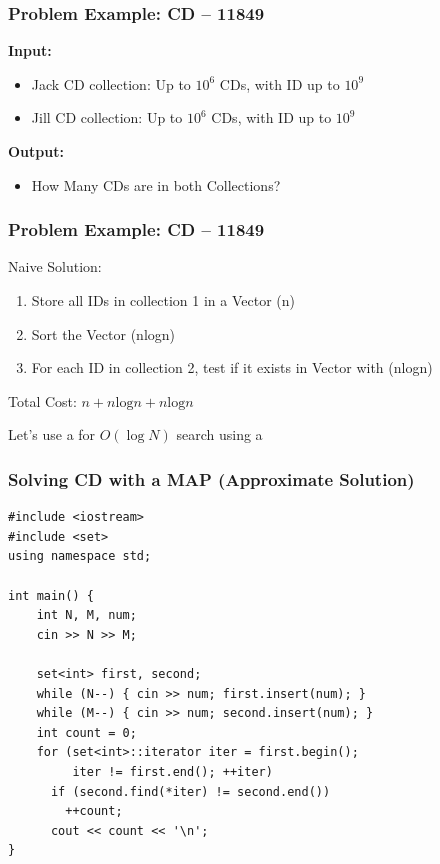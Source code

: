 \documentclass{beamer}
\begin{document}
\begin{frame}
  \frametitle{Problem Example: CD -- 11849}

  \begin{block}{}
    {\bf Input:}
    \begin{itemize}
    \item Jack CD collection: Up to $10^6$ CDs, with ID up to $10^9$
    \item Jill CD collection: Up to $10^6$ CDs, with ID up to $10^9$
    \end{itemize}

    {\bf Output:}
    \begin{itemize}
    \item How Many CDs are in both Collections?
    \end{itemize}

  \end{block}
\end{frame}

\begin{frame}
  \frametitle{Problem Example: CD -- 11849}

  Naive Solution:

  \begin{enumerate}
  \item Store all IDs in collection 1 in a Vector (n)
  \item Sort the Vector (nlogn)
  \item For each ID in collection 2, test if it exists in Vector with  (nlogn)
  \end{enumerate}

  Total Cost: $n + n\text{log}n + n\text{log}n$

  \bigskip

  Let's use a  for $O(\log N)$ search using a 
\end{frame}

\begin{frame}[fragile]
  \frametitle{Solving CD with a MAP (Approximate Solution)}

{\smaller
  \begin{block}{}
\begin{verbatim}
#include <iostream>
#include <set>
using namespace std;

int main() {
    int N, M, num;
    cin >> N >> M;

    set<int> first, second;
    while (N--) { cin >> num; first.insert(num); }
    while (M--) { cin >> num; second.insert(num); }
    int count = 0;
    for (set<int>::iterator iter = first.begin();
         iter != first.end(); ++iter)
      if (second.find(*iter) != second.end())
        ++count;
      cout << count << '\n';
}
\end{verbatim}
\end{block}}
\end{frame}
\end{document}

